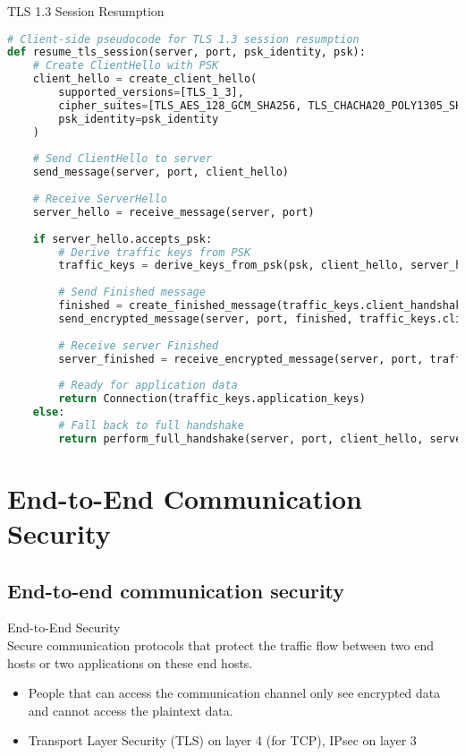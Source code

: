 \begin{examplecode}{TLS 1.3 Session Resumption}\\
\begin{lstlisting}[language=Python, style=basesmol]
# Client-side pseudocode for TLS 1.3 session resumption
def resume_tls_session(server, port, psk_identity, psk):
    # Create ClientHello with PSK
    client_hello = create_client_hello(
        supported_versions=[TLS_1_3],
        cipher_suites=[TLS_AES_128_GCM_SHA256, TLS_CHACHA20_POLY1305_SHA256],
        psk_identity=psk_identity
    )
    
    # Send ClientHello to server
    send_message(server, port, client_hello)
    
    # Receive ServerHello
    server_hello = receive_message(server, port)
    
    if server_hello.accepts_psk:
        # Derive traffic keys from PSK
        traffic_keys = derive_keys_from_psk(psk, client_hello, server_hello)
        
        # Send Finished message
        finished = create_finished_message(traffic_keys.client_handshake_key)
        send_encrypted_message(server, port, finished, traffic_keys.client_handshake_key)
        
        # Receive server Finished
        server_finished = receive_encrypted_message(server, port, traffic_keys.server_handshake_key)
        
        # Ready for application data
        return Connection(traffic_keys.application_keys)
    else:
        # Fall back to full handshake
        return perform_full_handshake(server, port, client_hello, server_hello)
\end{lstlisting}
\end{examplecode}

\section{End-to-End Communication Security}

\subsection{End-to-end communication security}

\begin{definition}{End-to-End Security}\\
    Secure communication protocols that protect the traffic flow between two end hosts or two applications on these end hosts.
    \begin{itemize}
        \item People that can access the communication channel only see encrypted data and cannot access the plaintext data.
        \item Transport Layer Security (TLS) on layer 4 (for TCP), IPsec on layer 3
    \end{itemize}
\end{definition}

